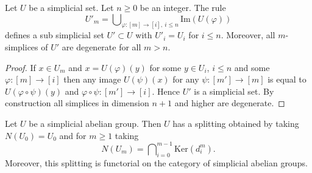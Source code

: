 \begin{lemma}
\label{lemma-simplicial-set-n-skel-sub}
Let $U$ be a simplicial set.
Let $n \geq 0$ be an integer.
The rule
$$
U'_m = \bigcup\nolimits_{\varphi : [m] \to [i], \ i\leq n} \text{Im}(U(\varphi))
$$
defines a sub simplicial set $U' \subset U$ with
$U'_i = U_i$ for $i \leq n$.
Moreover, all $m$-simplices of $U'$ are degenerate for
all $m > n$.
\end{lemma}

\begin{proof}
If $x \in U_m$ and $x = U(\varphi)(y)$
for some $y \in U_i$, $i \leq n$ and some $\varphi : [m] \to [i]$
then any image $U(\psi)(x)$ for any $\psi : [m'] \to [m]$ is
equal to $U(\varphi \circ \psi)(y)$ and $\varphi \circ \psi :
[m'] \to [i]$. Hence $U'$ is a simplicial set. By construction
all simplices in dimension $n + 1$ and higher are degenerate.
\end{proof}

\begin{lemma}
\label{lemma-splitting-simplicial-groups}
Let $U$ be a simplicial abelian group.
Then $U$ has a splitting obtained by taking $N(U_0) = U_0$ and
for $m \geq 1$ taking
$$
N(U_m) = \bigcap\nolimits_{i = 0}^{m - 1} \text{Ker}(d^m_i).
$$
Moreover, this splitting is functorial on the category
of simplicial abelian groups.
\end{lemma}

